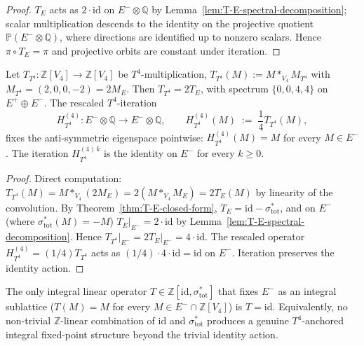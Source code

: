 \begin{proof}
$T_E$ acts as $2 \cdot \mathrm{id}$ on $E^- \otimes \mathbb{Q}$ by
Lemma~\ref{lem:T-E-spectral-decomposition}; scalar multiplication
descends to the identity on the projective quotient $\mathbb{P}(E^- \otimes
\mathbb{Q})$, where directions are identified up to nonzero scalars.
Hence $\pi \circ T_E = \pi$ and projective orbits are constant under
iteration.
\end{proof}

\begin{theorem}
\label{thm:rescaled-T4-fixed-point}
Let $T_{T^4} \colon \mathbb{Z}[V_4] \to \mathbb{Z}[V_4]$ be
$T^4$-multiplication, $T_{T^4}(M) := M *_{V_4} M_{T^4}$ with
$M_{T^4} = (2, 0, 0, -2) = 2 M_E$. Then $T_{T^4} = 2 T_E$, with
spectrum $\{0, 0, 4, 4\}$ on $E^+ \oplus E^-$. The rescaled
$T^4$-iteration
\[
 H_{T^4}^{(4)} \colon E^- \otimes \mathbb{Q} \to E^- \otimes \mathbb{Q},
 \qquad H_{T^4}^{(4)}(M) \;:=\; \frac{1}{4} T_{T^4}(M),
\]
fixes the anti-symmetric eigenspace pointwise: $H_{T^4}^{(4)}(M) = M$
for every $M \in E^-$. The iteration $H_{T^4}^{(4)\,k}$ is the identity
on $E^-$ for every $k \geq 0$.
\end{theorem}

\begin{proof}
Direct computation: $T_{T^4}(M) = M *_{V_4} (2 M_E) = 2 (M *_{V_4} M_E) = 2 T_E(M)$
by linearity of the convolution. By Theorem~\ref{thm:T-E-closed-form},
$T_E = \mathrm{id} - \sigma_{\mathrm{tot}}^*$, and on $E^-$
\textup{(}where $\sigma_{\mathrm{tot}}^*(M) = -M$\textup{)}
$T_E\big|_{E^-} = 2 \cdot \mathrm{id}$ by
Lemma~\ref{lem:T-E-spectral-decomposition}. Hence
$T_{T^4}\big|_{E^-} = 2 T_E\big|_{E^-} = 4 \cdot \mathrm{id}$. The rescaled
operator $H_{T^4}^{(4)} = (1/4) T_{T^4}$ acts as
$(1/4) \cdot 4 \cdot \mathrm{id} = \mathrm{id}$ on $E^-$. Iteration
preserves the identity action.
\end{proof}

\begin{theorem}
\label{thm:no-non-trivial-integral-fixed-point-T4}
The only integral linear operator $T \in \mathbb{Z}[\mathrm{id}, \sigma_{\mathrm{tot}}^*]$
that fixes $E^-$ as an integral sublattice
\textup{(}$T(M) = M$ for every $M \in E^- \cap \mathbb{Z}[V_4]$\textup{)} is
$T = \mathrm{id}$. Equivalently, no non-trivial $\mathbb{Z}$-linear
combination of $\mathrm{id}$ and $\sigma_{\mathrm{tot}}^*$ produces a
genuine $T^4$-anchored integral fixed-point structure beyond the trivial
identity action.
\end{theorem}

